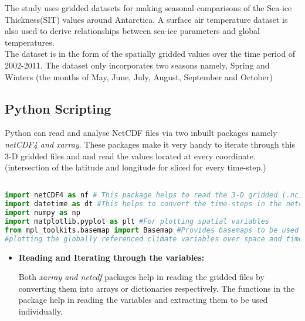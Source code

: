 \documentclass{article} %
\begin{document}
The study uses gridded datasets for making seasonal comparisons of the Sea-ice Thickness(SIT) values around Antarctica. A surface air temperature dataset is also used to derive relationships between sea-ice parameters and global temperatures. \\
The dataset is in the form of the spatially gridded values over the time period of 2002-2011. The dataset only incorporates two seasons namely, Spring and Winters (the months of May, June, July, August, September and October)

\subsection{Python Scripting}

Python can read and analyse NetCDF files via two inbuilt packages namely {\it netCDF4 and xarray}. These packages make it very handy to iterate through this 3-D gridded files and and read the values located at every coordinate. (intersection of the latitude and longitude for sliced for every time-step.) \\

\begin{lstlisting}[language=Python, caption=Importing required packages]

import netCDF4 as nf # This package helps to read the 3-D gridded (.nc) format.  
import datetime as dt #This helps to convert the time-steps in the netcdf files into readble date format 
import numpy as np
import matplotlib.pyplot as plt #For plotting spatial variables 
from mpl_toolkits.basemap import Basemap #Provides basemaps to be used as reference backgrounds for the 
#plotting the globally referenced climate variables over space and time

\end{lstlisting}


\begin{itemize}
    \item {\bf Reading and Iterating through the variables:}
    
Both {\it xarray and netcdf} packages help in reading the gridded files by  converting them into arrays or dictionaries respectively. The functions in the package help in reading the variables and extracting them to be used individually. 
    
    \end{itemize}
\end{document}
